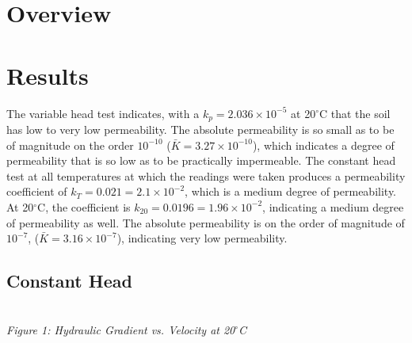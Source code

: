 \documentclass{article}
\begin{document}

\newpage
\doublespacing
\tableofcontents
\newpage
{}
\listoffigures
\newpage
\section{Overview} 
\section{Results}
The variable head test indicates, with a  $k_p=2.036\times10^{-5}$ at 20$^\circ$C that the soil has low to very low permeability. The absolute permeability is so small as to be of magnitude on the order $10^{-10}$ ($\bar{K}=3.27\times10^{-10}$), which indicates a degree of permeability that is so low as to be practically impermeable.
The constant head test at all temperatures at which the readings were taken produces a permeability coefficient of $k_T=0.021=2.1\times 10^{-2}$, which is a medium degree of permeability. At 20$^\circ$C, the coefficient is $k_{20}=0.0196=1.96\times10^{-2}$, indicating a medium degree of permeability as well. The absolute permeability is on the order of magnitude of $10^{-7}$, ($\bar{K}=3.16\times10^{-7}$), indicating very low permeability. 
\subsection{Constant Head}
\begin{center}
    \pgfplotsset{width=10cm}
    \vspace{3mm}
    \emph{\\Figure 1: Hydraulic Gradient vs. Velocity at 20$^\circ$C\\}
\end{center}
\newpage
\end{document}
